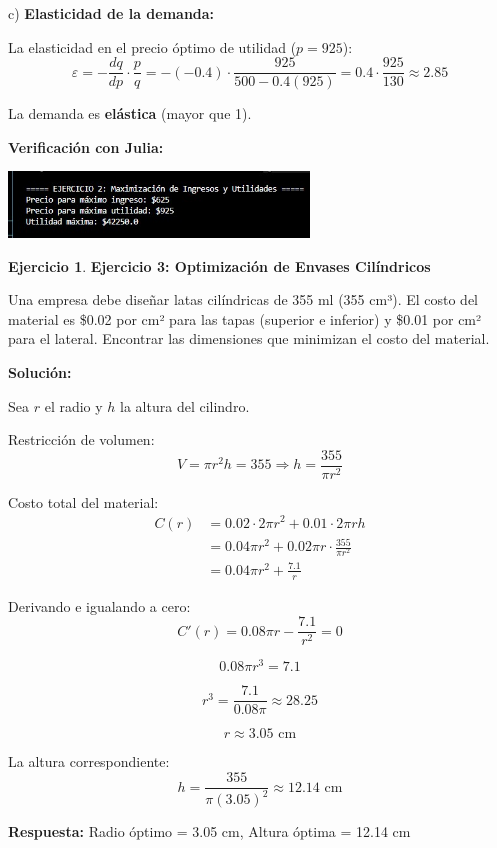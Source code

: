 \documentclass[12pt, a4paper, oneside]{book}
\theoremstyle{definition}
\newtheorem{ejercicio}{Ejercicio}[chapter]
\begin{document}
c) \textbf{Elasticidad de la demanda:}

La elasticidad en el precio óptimo de utilidad ($p = 925$):
$$\varepsilon = -\frac{dq}{dp} \cdot \frac{p}{q} = -(-0.4) \cdot \frac{925}{500 - 0.4(925)} = 0.4 \cdot \frac{925}{130} \approx 2.85$$

La demanda es \textbf{elástica} (mayor que 1).

\textbf{Verificación con Julia:}


\begin{center}
\includegraphics[width=0.6\textwidth]{ejercicio2fm.png}
\end{center}

\begin{ejercicio}
\textbf{Ejercicio 3: Optimización de Envases Cilíndricos}

Una empresa debe diseñar latas cilíndricas de 355 ml (355 cm³). El costo del material es \$0.02 por cm² para las tapas (superior e inferior) y \$0.01 por cm² para el lateral. Encontrar las dimensiones que minimizan el costo del material.
\end{ejercicio}

\textbf{Solución:}

Sea $r$ el radio y $h$ la altura del cilindro.

Restricción de volumen:
$$V = \pi r^2 h = 355 \Rightarrow h = \frac{355}{\pi r^2}$$

Costo total del material:
\begin{align*}
C(r) &= 0.02 \cdot 2\pi r^2 + 0.01 \cdot 2\pi rh \\
&= 0.04\pi r^2 + 0.02\pi r \cdot \frac{355}{\pi r^2} \\
&= 0.04\pi r^2 + \frac{7.1}{r}
\end{align*}

Derivando e igualando a cero:
$$C'(r) = 0.08\pi r - \frac{7.1}{r^2} = 0$$

$$0.08\pi r^3 = 7.1$$

$$r^3 = \frac{7.1}{0.08\pi} \approx 28.25$$

$$r \approx 3.05 \text{ cm}$$

La altura correspondiente:
$$h = \frac{355}{\pi (3.05)^2} \approx 12.14 \text{ cm}$$

\textbf{Respuesta:} Radio óptimo = 3.05 cm, Altura óptima = 12.14 cm
\end{document}
